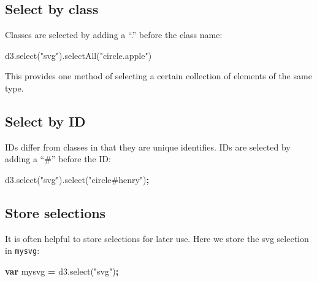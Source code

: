 \documentclass[openany]{book}
\newenvironment{Shaded}{\begin{snugshade}}{\end{snugshade}}
\newcommand{\AttributeTok}[1]{\textcolor[rgb]{0.77,0.63,0.00}{#1}}
\newcommand{\KeywordTok}[1]{\textcolor[rgb]{0.13,0.29,0.53}{\textbf{#1}}}
\newcommand{\NormalTok}[1]{#1}
\newcommand{\OperatorTok}[1]{\textcolor[rgb]{0.81,0.36,0.00}{\textbf{#1}}}
\newcommand{\StringTok}[1]{\textcolor[rgb]{0.31,0.60,0.02}{#1}}
\newcommand{\VariableTok}[1]{\textcolor[rgb]{0.00,0.00,0.00}{#1}}
\begin{document}
\hypertarget{select-by-class}{%
\subsection{Select by class}\label{select-by-class}}

Classes are selected by adding a ``.'' before the class name:

\begin{Shaded}
\begin{Highlighting}[]
\VariableTok{d3}\NormalTok{.}\AttributeTok{select}\NormalTok{(}\StringTok{"svg"}\NormalTok{).}\AttributeTok{selectAll}\NormalTok{(}\StringTok{"circle.apple"}\NormalTok{)}
\end{Highlighting}
\end{Shaded}

This provides one method of selecting a certain collection of elements of the same type.

\hypertarget{select-by-id}{%
\subsection{Select by ID}\label{select-by-id}}

IDs differ from classes in that they are unique identifies. IDs are selected by adding a ``\#'' before the ID:

\begin{Shaded}
\begin{Highlighting}[]
\VariableTok{d3}\NormalTok{.}\AttributeTok{select}\NormalTok{(}\StringTok{"svg"}\NormalTok{).}\AttributeTok{select}\NormalTok{(}\StringTok{"circle#henry"}\NormalTok{)}\OperatorTok{;}
\end{Highlighting}
\end{Shaded}

\hypertarget{store-selections}{%
\subsection{Store selections}\label{store-selections}}

It is often helpful to store selections for later use. Here we store the svg selection in \texttt{mysvg}:

\begin{Shaded}
\begin{Highlighting}[]
\KeywordTok{var}\NormalTok{ mysvg }\OperatorTok{=} \VariableTok{d3}\NormalTok{.}\AttributeTok{select}\NormalTok{(}\StringTok{"svg"}\NormalTok{)}\OperatorTok{;}
\end{Highlighting}
\end{Shaded}
\end{document}
